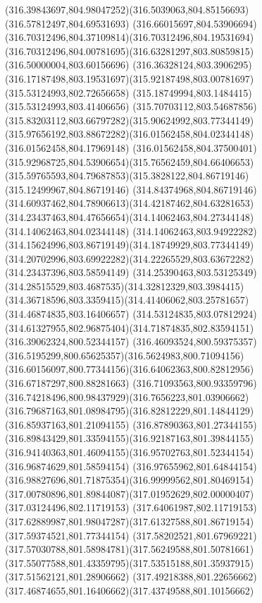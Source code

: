 {{	\curveto(316.39843697,804.98047252)(316.5039063,804.85156693)(316.57812497,804.69531693)
	\curveto(316.66015697,804.53906694)(316.70312496,804.37109814)(316.70312496,804.19531694)
	\curveto(316.70312496,804.00781695)(316.63281297,803.80859815)(316.50000004,803.60156696)
	\curveto(316.36328124,803.3906295)(316.17187498,803.19531697)(315.92187498,803.00781697)
	\lineto(315.53124993,802.72656658)
	\lineto(315.18749994,803.1484415)
	\lineto(315.53124993,803.41406656)
	\curveto(315.70703112,803.54687856)(315.83203112,803.66797282)(315.90624992,803.77344149)
	\curveto(315.97656192,803.88672282)(316.01562458,804.02344148)(316.01562458,804.17969148)
	\curveto(316.01562458,804.37500401)(315.92968725,804.53906654)(315.76562459,804.66406653)
	\curveto(315.59765593,804.79687853)(315.3828122,804.86719146)(315.12499967,804.86719146)
	\curveto(314.84374968,804.86719146)(314.60937462,804.78906613)(314.42187462,804.63281653)
	\curveto(314.23437463,804.47656654)(314.14062463,804.27344148)(314.14062463,804.02344148)
	\curveto(314.14062463,803.94922282)(314.15624996,803.86719149)(314.18749929,803.77344149)
	\curveto(314.20702996,803.69922282)(314.22265529,803.63672282)(314.23437396,803.58594149)
	\curveto(314.25390463,803.53125349)(314.28515529,803.4687535)(314.32812329,803.3984415)
	\curveto(314.36718596,803.3359415)(314.41406062,803.25781657)(314.46874835,803.16406657)
	\curveto(314.53124835,803.07812924)(314.61327955,802.96875404)(314.71874835,802.83594151)
	\lineto(316.39062324,800.52344157)
	\curveto(316.46093524,800.59375357)(316.5195299,800.65625357)(316.5624983,800.71094156)
	\curveto(316.60156097,800.77344156)(316.64062363,800.82812956)(316.67187297,800.88281663)
	\curveto(316.71093563,800.93359796)(316.74218496,800.98437929)(316.7656223,801.03906662)
	\curveto(316.79687163,801.08984795)(316.82812229,801.14844129)(316.85937163,801.21094155)
	\curveto(316.87890363,801.27344155)(316.89843429,801.33594155)(316.92187163,801.39844155)
	\curveto(316.94140363,801.46094155)(316.95702763,801.52344154)(316.96874629,801.58594154)
	\curveto(316.97655962,801.64844154)(316.98827696,801.71875354)(316.99999562,801.80469154)
	\curveto(317.00780896,801.89844087)(317.01952629,802.00000407)(317.03124496,802.11719153)
	\lineto(317.64061987,802.11719153)
	\curveto(317.62889987,801.98047287)(317.61327588,801.86719154)(317.59374521,801.77344154)
	\curveto(317.58202521,801.67969221)(317.57030788,801.58984781)(317.56249588,801.50781661)
	\curveto(317.55077588,801.43359795)(317.53515188,801.35937915)(317.51562121,801.28906662)
	\curveto(317.49218388,801.22656662)(317.46874655,801.16406662)(317.43749588,801.10156662)
}}
